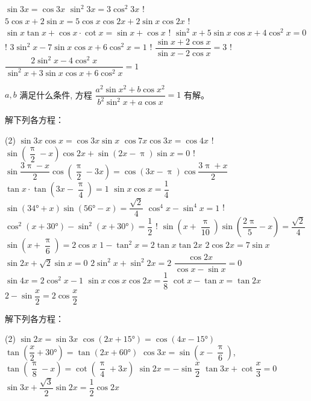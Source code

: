 \begin{Exercise}
\begin{question}
\begin{tasks}
    \task   $\sin 3 x=\cos 3 x$
    \task   $\sin ^{2} 3 x=3 \cos ^{2} 3 x$
    \task!  $ 5 \cos x+2 \sin x=5 \cos x \cos 2 x+2 \sin x \cos 2 x$   
    \task!  $\sin x \tan x+\cos x \cdot \cot x=\sin x+\cos x$
    \task!  $\sin ^{2} x+5 \sin x \cos x+4 \cos ^{2} x=0$
    \task! $3 \sin ^{2} x-7 \sin x \cos x+6 \cos ^{2} x=1$
    \task!  $\dfrac{\sin x+2 \cos x}{\sin x-2 \cos x}=3$
    \task!  $\dfrac{2 \sin ^{2} x-4 \cos ^{2} x}{\sin ^{2} x+3 \sin x \cos x+6 \cos ^{2} x}=1$
  \end{tasks}
  \item $a, b$ 满足什么条件, 方程 $\dfrac{a^{2} \sin x^{2}+b \cos x^{2}}{b^{2} \sin ^{2} x+a \cos x}=1$ 有解。
  \item 解下列各方程：
  \begin{tasks}(2)
    \task  $\sin 3 x \cos x=\cos 3 x \sin x$
    \task  $\cos 7 x \cos 3 x=\cos 4 x$
    \task! $\sin \left(\dfrac{\uppi}{2}-x\right) \cos 2 x+\sin (2 x-\uppi) \sin x=0$
    \task! $\sin \dfrac{3 \uppi-x}{2} \cos \left(\dfrac{\uppi}{2}-3 x\right) =\cos (3 x-\uppi) \cos \dfrac{3 \uppi+x}{2}$
    \task  $\tan x\cdot \tan\left(3x-\dfrac{\uppi}{4}\right)=1$
    \task  $\sin x\cos x=\dfrac{1}{4}$
    \task  $\sin(\ang{34}+x)\sin(\ang{56}-x)=\dfrac{\sqrt{2}}{4}$
    \task  $\cos^4x-\sin^4x=1$
    \task! $\cos ^{2}\left(x+\ang{30}\right)-\sin ^{2}\left(x+\ang{30}\right)=\dfrac{1}{2}$
    \task! $\sin \left(x+\dfrac{\uppi}{10}\right) \sin \left(\dfrac{2 \uppi}{5}-x\right)=\dfrac{\sqrt{2}}{4}$
    \task  $\sin \left(x+\dfrac{\uppi}{6}\right)=2 \cos x$
    \task  $1-\tan^{2} x=2 \tan x \tan 2 x$
    \task  $2 \cos 2 x=7 \sin x $
    \task  $\sin 2 x+\sqrt{2} \sin x=0$
    \task  $2 \sin ^{2} x+\sin ^{2} 2 x=2$
    \task  $\dfrac{\cos 2 x}{\cos x-\sin x}=0$
    \task  $\sin 4 x=2 \cos ^{2} x-1 $
    \task  $\sin x \cos x \cos 2 x=\dfrac{1}{8}$
    \task  $\cot x-\tan x=\tan 2 x$
    \task  $2-\sin \dfrac{x}{2}=2 \cos \dfrac{x}{2}$
  \end{tasks}
  \item 解下列各方程：
  \begin{tasks}(2)
    \task  $\sin 2 x=\sin 3 x$
    \task  $\cos \left(2 x+\ang{15}\right)=\cos \left(4 x-\ang{15}\right)$
    \task  $\tan\left(\dfrac{x}{2}+\ang{30}\right)=\tan\left(2 x+\ang{60}\right)$
    \task  $\cos 3 x=\sin \left(x-\dfrac{\uppi}{6}\right)$,
    \task  $\tan\left(\dfrac{\uppi}{8}-x\right)=\cot\left(\dfrac{\uppi}{4}+3 x\right)$
    \task  $\sin 2 x=-\sin \dfrac{x}{2}$
    \task  $\tan 3 x+\cot \dfrac{x}{3}=0$
    \task  $\sin 3 x+\dfrac{\sqrt{3}}{2} \sin 2 x=\dfrac{1}{2} \cos 2 x$

\end{tasks}
\end{question}
\end{Exercise}
